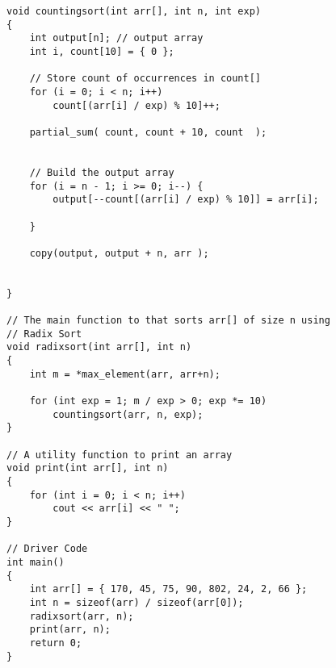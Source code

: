\begin{verbatim}
void countingsort(int arr[], int n, int exp)
{
	int output[n]; // output array
	int i, count[10] = { 0 };

	// Store count of occurrences in count[]
	for (i = 0; i < n; i++)
		count[(arr[i] / exp) % 10]++;

	partial_sum( count, count + 10, count  );


	// Build the output array
	for (i = n - 1; i >= 0; i--) {
		output[--count[(arr[i] / exp) % 10]] = arr[i];
		
	}

    copy(output, output + n, arr );

	
}

// The main function to that sorts arr[] of size n using
// Radix Sort
void radixsort(int arr[], int n)
{
	int m = *max_element(arr, arr+n);

	for (int exp = 1; m / exp > 0; exp *= 10)
		countingsort(arr, n, exp);
}

// A utility function to print an array
void print(int arr[], int n)
{
	for (int i = 0; i < n; i++)
		cout << arr[i] << " ";
}

// Driver Code
int main()
{
	int arr[] = { 170, 45, 75, 90, 802, 24, 2, 66 };
	int n = sizeof(arr) / sizeof(arr[0]);
	radixsort(arr, n);
	print(arr, n);
	return 0;
}

\end{verbatim}
